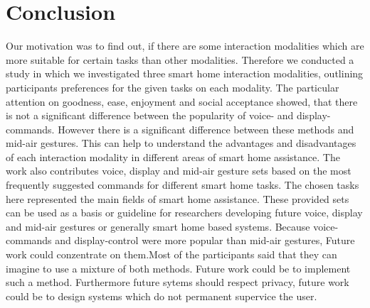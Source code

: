 \documentclass[sigchi]{acmart}
\begin{document}
	\section{Conclusion}
	Our motivation was to find out, if there are some interaction modalities which are more suitable for certain tasks than other modalities. Therefore we conducted a study in which we investigated three smart home interaction modalities, outlining participants preferences for the given tasks on each modality. The particular attention on goodness, ease, enjoyment and social acceptance showed, that there is not a significant difference between the popularity of voice- and display-commands. However there is a significant difference between these methods and mid-air gestures. This can help to understand the advantages and disadvantages of each interaction modality in different areas of smart home assistance. The work also contributes voice, display and mid-air gesture sets based on the most frequently suggested commands for different smart home tasks. The chosen tasks here represented the main fields of smart home assistance. These provided sets can be used as a basis or guideline for researchers developing future voice, display and mid-air gestures or generally smart home based systems. Because voice-commands and display-control were more popular than mid-air gestures, Future work could conzentrate on them.Most of the participants said that they can imagine to use a mixture of both methods. Future work could be to implement such a method. Furthermore future sytems should respect privacy, future work could be to design systems which do not permanent supervice the user.
	
	
	
	
	
\end{document}
